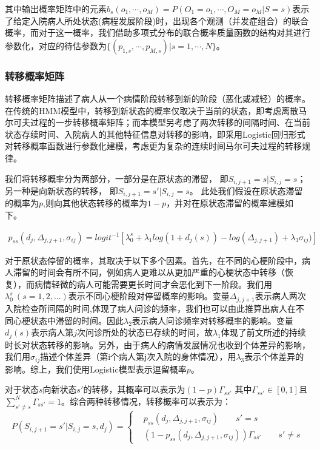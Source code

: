 \documentclass{article}
\begin{document}
其中输出概率矩阵中的元素$b_s(o_1,\cdots, o_M) = P(O_1=o_1,\cdots,O_M=o_M|S=s)$表示了给定入院病人所处状态(病程发展阶段)时，出现各个观测（并发症组合）的联合概率，而对于这一概率，我们借助多项式分布的联合概率质量函数的结构对其进行参数化，对应的待估参数为$\{(p_{1,s},\cdots,p_{M,s})|s=1,\cdots,N\}$。


\subsubsection{转移概率矩阵}
转移概率矩阵描述了病人从一个病情阶段转移到新的阶段（恶化或减轻）的概率。在传统的HMM模型中，转移到新状态的概率仅取决于当前的状态，即考虑离散马尔可夫过程的一步转移概率矩阵；而本模型另考虑了两次转移的间隔时间、在当前状态存续时间、入院病人的其他特征信息对转移的影响，即采用Logistic回归形式对转移概率函数进行参数化建模，考虑更为复杂的连续时间马尔可夫过程的转移规律。\par

我们将转移概率分为两部分，一部分是在原状态的滞留，
即${S_{i,j+1} = s| S_{i,j} = s}$；
另一种是向新状态的转移，
即${S_{i,j+1} = s'| S_{i,j} =s}$。
此处我们假设在原状态滞留的概率为$p$,则向其他状态转移的概率为$1-p$，并对在原状态滞留的概率建模如下。
\par
\begin{equation}
	\begin{aligned}
		p_{ss}(d_j,\Delta_{j,j+1},\sigma_{ij})
		= logit^{-1}[\lambda_0^s + \lambda_1 log(1+d_j(s)) - log(\Delta_{j,j+1}) + \lambda_3\sigma_{ij}) ]
	\end{aligned}
\end{equation}\par
对于原状态停留的概率，其取决于以下多个因素。首先，在不同的心梗阶段中，病人滞留的时间会有所不同，例如病人更难以从更加严重的心梗状态中转移（恢复），而病情轻微的病人可能需要更长时间才会恶化到下一阶段。我们用$\lambda_0^s\ (s=1,2,...)$表示不同心梗阶段对停留概率的影响。变量$\Delta_{j,j+1}$表示病人两次入院检查所间隔的时间,体现了病人问诊的频率，我们也可以由此推算出病人在不同心梗状态中滞留的时间。因此$\lambda_2$表示病人问诊频率对转移概率的影响。变量$d_j(s)$表示病人第$j$次问诊所处的状态已存续的时间，故$\lambda_1$体现了前文所述的持续时长对状态转移的影响。另外，由于病人的病情发展情况也收到个体差异的影响，我们用$\sigma_{ij}$描述个体差异（第i个病人第j次入院的身体情况），用$\lambda_3$表示个体差异的影响。综上，我们使用Logistic模型表示逗留概率$p$。
\par

对于状态$s$向新状态$s'$的转移，其概率可以表示为$(1-p)\Gamma_{ss'}$
其中$\Gamma_{ss'}\in [0,1]$且$\sum_{s'\neq s}^{N}\Gamma_{ss'}=1$。综合两种转移情况，转移概率可以表示为：
\begin{equation}
	 P(S_{i,j+1} = s'| S_{i,j} = s,d_j)
	 =
	\begin{cases}
     	& p_{ss}(d_j,\Delta_{j,j+1},\sigma_{ij}) \qquad s'=s\\	
		& (1-p_{ss}(d_j,\Delta_{j,j+1},\sigma_{ij}))\Gamma_{ss'} \qquad s'\neq s
	\end{cases}
\end{equation}\par
\end{document}

